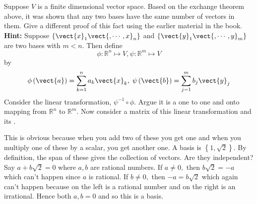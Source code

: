 \begin{enumialphparenastyle}
\begin{ex} Suppose $V$ is a finite dimensional vector space. Based on the
exchange theorem above, it was shown that any two bases have the same number
of vectors in them. Give a different proof of this fact using the earlier
material in the book. \textbf{Hint: }Suppose $\left\{ \vect{x}_{1}\vect{
,\cdots ,x}_{n}\right\} $ and $\left\{ \vect{y}_{1}\vect{,\cdots ,y}
_{m}\right\} $ are two bases with $m<n.$ Then define 
\begin{equation*}
\phi :\mathbb{R}^{n}\mapsto V,\psi :\mathbb{R}^{m}\mapsto V
\end{equation*}
by 
\begin{equation*}
\phi \left( \vect{a}\right) = \sum_{k=1}^{n}a_{k}\vect{x}
_{k},\;\psi \left( \vect{b}\right) = \sum_{j=1}^{m}b_{j}\vect{y}_{j}
\end{equation*}
Consider the linear transformation, $\psi ^{-1}\circ \phi .$ Argue it is a
one to one and onto mapping from $\mathbb{R}^{n}$ to $\mathbb{R}^{m}.$ Now
consider a matrix of this linear transformation and its {\rref}.
\begin{sol}
This is obvious because
when you add two of these you get one and when you multiply one of these by
a scalar, you get another one. A basis is $\left\{ 1,\sqrt{2}\right\} $. By
definition, the span of these gives the collection of vectors. Are they
independent? Say $a+b\sqrt{2}=0$ where $a,b$ are rational numbers. If $a\neq
0,$ then $b\sqrt{2}=-a$ which can't happen since $a$ is rational. If $b\neq
0,$ then $-a=b\sqrt{2}$ which again can't happen because on the left is a
rational number and on the right is an irrational. Hence both $a,b=0$ and so
this is a basis.
\end{sol}
\end{ex}

\end{enumialphparenastyle}
